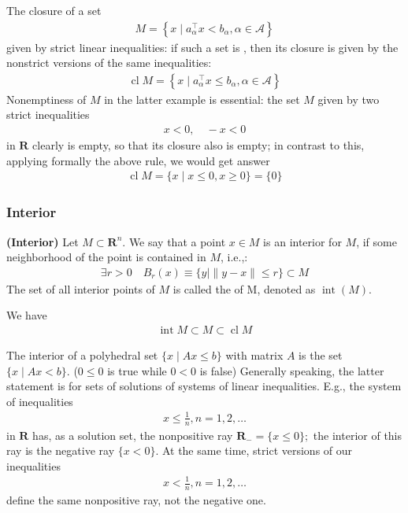 \documentclass{article}
\newcommand{\bfs}[1]{\textbf{({#1}) }}
\newcommand{\inte}{\operatorname{int}}
\begin{document}
\begin{exma}
 The closure of a set
\begin{align*}
M=\left\{x \mid a_{\alpha}^{\top} x<b_{\alpha}, \alpha \in \mathcal{A}\right\}
\end{align*}
given by strict linear inequalities: if such a set is , then its closure is given by the nonstrict versions of the same inequalities:
\begin{align*}
\operatorname{cl} M=\left\{x \mid a_{\alpha}^{\top} x \leq b_{\alpha}, \alpha \in \mathcal{A}\right\}
\end{align*}
Nonemptiness of $M$ in the latter example is essential: the set $M$ given by two strict inequalities
\begin{align*}
x<0, \quad-x<0
\end{align*}
in $\mathbf{R}$ clearly is empty, so that its closure also is empty; in contrast to this, applying formally the above rule, we would get  answer
\begin{align*}
\operatorname{cl} M=\{x \mid x \leq 0, x \geq 0\}=\{0\}
\end{align*}
\end{exma}

\subsubsection{Interior}
\begin{defa}{\bfs{Interior}}
 Let $M \subset \mathbf{R}^{n}$. We say that a point $x \in M$ is an interior for $M$, if some neighborhood of the point is contained in $M$, i.e.,:
\begin{align*}
\exists r>0 \quad B_{r}(x) \equiv\{y|\| y-x \| \leq r\} \subset M
\end{align*}
The set of all interior points of $M$ is called the  of M, denoted as $\inte(M)$.
\end{defa}

We have 
\begin{align*}
\operatorname{int} M \subset M \subset \operatorname{cl} M
\end{align*}
\begin{exma}
 The interior of a polyhedral set $\{x \mid A x \leq b\}$ with matrix $A$  is the set $\{x \mid A x<b\}$. ($0\le 0$ is true while $0<0$ is false)
 Generally speaking, the latter statement is  for sets of solutions of  systems of linear inequalities. E.g., the system of inequalities
\begin{align*}
x \leq \frac{1}{n}, n=1,2, \ldots
\end{align*}
in $\mathbf{R}$ has, as a solution set, the nonpositive ray $\mathbf{R}_{-}=\{x \leq 0\} ;$ the interior of this ray is the negative ray $\{x<0\}$. At the same time, strict versions of our inequalities
\begin{align*}
x<\frac{1}{n}, n=1,2, \ldots
\end{align*}
define the same nonpositive ray, not the negative one.
\end{exma}
\end{document}
